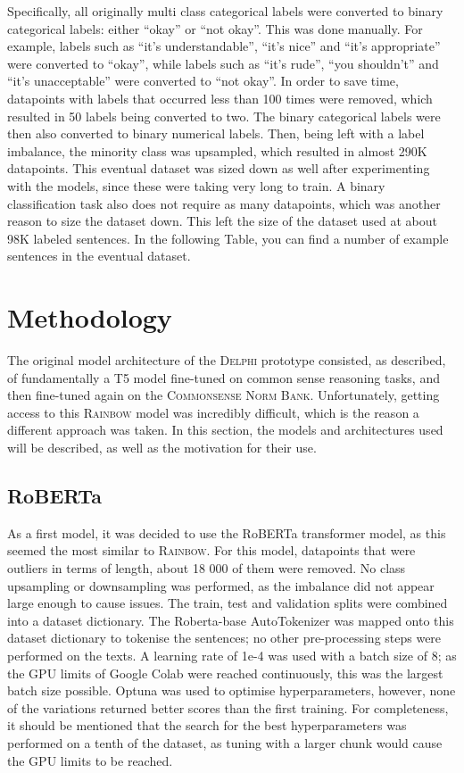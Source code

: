 \documentclass[final]{clv3} %
\begin{document}
Specifically, all originally multi class categorical labels were converted to binary categorical labels: either “okay” or “not okay”. This was done manually. For example, labels such as “it’s understandable”, “it’s nice” and “it’s appropriate” were converted to “okay”, while labels such as “it’s rude”, “you shouldn’t” and “it’s unacceptable” were converted to “not okay”. In order to save time, datapoints with labels that occurred less than 100 times were removed, which resulted in 50 labels being converted to two. The binary categorical labels were then also converted to binary numerical labels. Then, being left with a label imbalance, the minority class was upsampled, which resulted in almost 290K datapoints. This eventual dataset was sized down as well after experimenting with the models, since these were taking very long to train. A binary classification task also does not require as many datapoints, which was another reason to size the dataset down. This left the size of the dataset used at about 98K labeled sentences. In the following Table, you can find a number of example sentences in the eventual dataset. 

\section{Methodology}

The original model architecture of the \textsc{Delphi} prototype consisted, as described, of fundamentally a T5 model fine-tuned on common sense reasoning tasks, and then fine-tuned again on the \textsc{Commonsense Norm Bank}. Unfortunately, getting access to this \textsc{Rainbow} model was incredibly difficult, which is the reason a different approach was taken. In this section, the models and architectures used will be described, as well as the motivation for their use. \\

\subsection{RoBERTa}

As a first model, it was decided to use the RoBERTa transformer model, as this seemed the most similar to \textsc{Rainbow}. For this model, datapoints that were outliers in terms of length, about 18 000 of them were removed. No class upsampling or downsampling was performed, as the imbalance did not appear large enough to cause issues. The train, test and validation splits were combined into a dataset dictionary. The Roberta-base AutoTokenizer was mapped onto this dataset dictionary to tokenise the sentences; no other pre-processing steps were performed on the texts. A learning rate of 1e-4 was used with a batch size of 8; as the GPU limits of Google Colab were reached continuously, this was the largest batch size possible. Optuna was used to optimise hyperparameters, however, none of the variations returned better scores than the first training. For completeness, it should be mentioned that the search for the best hyperparameters was performed on a tenth of the dataset, as tuning with a larger chunk would cause the GPU limits to be reached.
\end{document}
